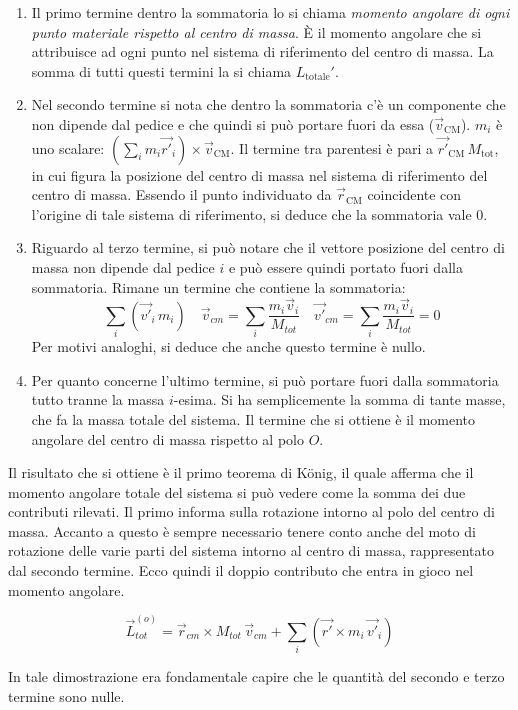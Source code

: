 \begin{enumerate}
	\item Il primo termine dentro la sommatoria lo si chiama \emph{momento angolare di ogni punto materiale rispetto al centro di massa}. È il momento angolare che si attribuisce ad ogni punto nel sistema di riferimento del centro di massa. La somma di tutti questi termini la si chiama $L_{\text{totale}}'$.
	\item Nel secondo termine si nota che dentro la sommatoria c'è un componente che non dipende dal pedice e che quindi si può portare fuori da essa ($\vec{v}_\text{CM}$). $m_i$ è uno scalare: $(\sum_i m_i\vec{r'}_i)\times \vec{v}_\text{CM}$. Il termine tra parentesi è pari a $\vec{r'}_\text{CM} \, M_\text{tot}$, in cui figura la posizione del centro di massa nel sistema di riferimento del centro di massa. Essendo il punto individuato da $\vec{r}_\text{CM}$ coincidente con l'origine di tale sistema di riferimento, si deduce che la sommatoria vale $0$.
	\item Riguardo al terzo termine, si può notare che il vettore posizione del centro di massa non dipende dal pedice $i$ e può essere quindi portato fuori dalla sommatoria. Rimane un termine che contiene la sommatoria:
	\[
		\sum_i (\vec{v'}_i\,m_i ) \quad \vec{v}_{cm} = \sum_i \frac{m_i\vec{v}_i  }{M_{tot} } \quad \vec{v'}_{cm} = \sum_i \frac{m_i\vec{v}_i}{M_{tot} } = 0
	\]
	Per motivi analoghi, si deduce che anche questo termine è nullo.
	\item Per quanto concerne l'ultimo termine, si può portare fuori dalla sommatoria tutto tranne la massa $i$-esima. Si ha semplicemente la somma di tante masse, che fa la massa totale del sistema. Il termine che si ottiene è il momento angolare del centro di massa rispetto al polo $O$.
\end{enumerate}

Il risultato che si ottiene è il primo teorema di K\"onig, il quale afferma che il momento angolare totale del sistema si può vedere come la somma dei due contributi rilevati.
Il primo informa sulla rotazione intorno al polo del centro di massa. Accanto a questo è sempre necessario tenere conto anche del moto di rotazione delle varie parti del sistema intorno al centro di massa, rappresentato dal secondo termine. Ecco quindi il doppio contributo che entra in gioco nel momento angolare.

\[
	\vec{L}_{tot}^{(o)} = \vec{r}_{cm}\times M_{tot}\,\vec{v}_{cm} + \sum_i (\vec{r'}\times m_i\,\vec{v'}_i)
\]

In tale dimostrazione era fondamentale capire che le quantità del secondo e terzo termine sono nulle.

